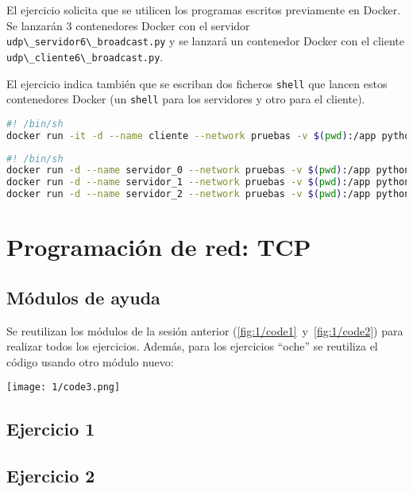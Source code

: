 El ejercicio solicita que se utilicen los programas escritos previamente en Docker.
Se lanzarán 3 contenedores Docker con el servidor \lstinline{udp\_servidor6\_broadcast.py}
y se lanzará un contenedor Docker con el cliente \lstinline{udp\_cliente6\_broadcast.py}.

El ejercicio indica también que se escriban dos ficheros \lstinline{shell}
que lancen estos contenedores Docker (un \lstinline{shell} para los servidores y otro para el cliente).

\begin{lstlisting}[language=bash]
#! /bin/sh
docker run -it -d --name cliente --network pruebas -v $(pwd):/app python:3.7 python /app/udp_cliente6_broadcast.py
\end{lstlisting}

\begin{lstlisting}[language=bash]
#! /bin/sh
docker run -d --name servidor_0 --network pruebas -v $(pwd):/app python:3.7 python /app/udp_servidor6_broadcast.py
docker run -d --name servidor_1 --network pruebas -v $(pwd):/app python:3.7 python /app/udp_servidor6_broadcast.py
docker run -d --name servidor_2 --network pruebas -v $(pwd):/app python:3.7 python /app/udp_servidor6_broadcast.py
\end{lstlisting}

\section{Programación de red: TCP}
\subsection{Módulos de ayuda}
Se reutilizan los módulos de la sesión anterior (\ref{fig:1/code1}~y~\ref{fig:1/code2}) para
realizar todos los ejercicios. Además, para los ejercicios ``oche'' se reutiliza el código
usando otro módulo nuevo: \\
\begin{minipage}{\linewidth}
	\centering
	\texttt{[image: 1/code3.png]}
	\label{fig:1/code3}
\end{minipage}

\subsection{Ejercicio 1}

\subsection{Ejercicio 2}

